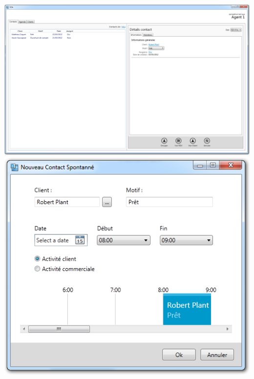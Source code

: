 \includegraphics[width=\textwidth]{../../ihm/pngIHM/ListeContacts.png}
\includegraphics[width=\textwidth]{../../ihm/pngIHM/NouveauContactSpontanne.png}


